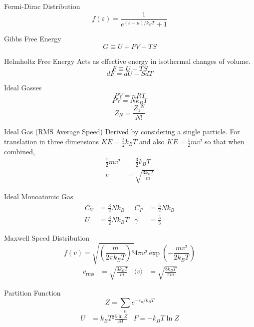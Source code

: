 \documentclass[avery5371]{flashcards}
\begin{document}
\begin{flashcard}{Fermi-Dirac Distribution}
	\[ f(ε) = \frac{1}{e^{(ε-μ)/k_B T} + 1} \]
\end{flashcard}

\begin{flashcard}{Gibbs Free Energy}
	\[ G ≡ U + PV - TS \]
\end{flashcard}

\begin{flashcard}{Helmholtz Free Energy}
	Acts as effective energy in isothermal changes of volume.
	\[ F ≡ U - TS \]
	\[ dF = dU - S dT \]
\end{flashcard}

\begin{flashcard}{Ideal Gasses}
	\[ PV = nRT \]
	\[ PV = N k_B T \]
	\[ Z_N = \frac{Z₁^N}{N!} \]	
\end{flashcard}

\begin{flashcard}{Ideal Gas (RMS Average Speed)}
	Derived by considering a single particle. For translation in three
	dimensions $KE = \frac 32 k_B T$  and also $KE = \frac 12 mv²$ so that
	when combined,
	\begin{align*}
		\frac 12 mv² &= \frac 32 k_B T \\
		v &= \sqrt{\frac{3 k_B T}{m}}
	\end{align*}
\end{flashcard}

\begin{flashcard}{Ideal Monoatomic Gas}
	\begin{align*}
		C_V &= \frac 32 Nk_B
			& C_P &= \frac 52 Nk_B \\
		U &= \frac 32 Nk_B T
			& γ &= \frac 53
	\end{align*}
\end{flashcard}

\begin{flashcard}{Maxwell Speed Distribution}
	\[ f(v) = \sqrt{ (\frac{m}{2π k_B T})³ } 4πv² \exp(-\frac{mv²}{2k_B T}) \]
	\begin{align*}
		v_\mathrm{rms} &= \sqrt{\frac{3k_B T}{m}}
			& ⟨v⟩ &= \sqrt{\frac{8k_B T}{πm}}
	\end{align*}
\end{flashcard}

\begin{flashcard}{Partition Function}
	\[ Z = \sum_n e^{-ε_n / k_B T} \]
	\begin{align*}
		U &= k_B T² \frac{∂ \ln Z}{∂T}
			& F = -k_B T \ln Z
	\end{align*}
\end{flashcard}
\end{document}
